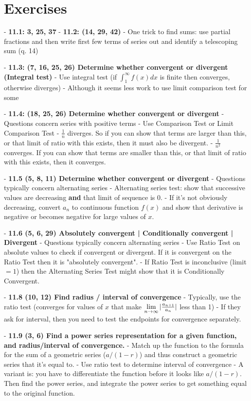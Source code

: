 \section{Exercises}

- \textbf{11.1: 3, 25, 37}
- \textbf{11.2: (14, 29, 42)}
    - One trick to find sums: use partial fractions and then write first few terms of series out and identify a telescoping sum (q. 14)

- \textbf{11.3: (7, 16, 25, 26) Determine whether convergent or divergent (Integral test)}
    - Use integral test (if $\int_1^\infty f(x) dx$ is finite then converges, otherwise diverges)
    - Although it seems less work to use limit comparison test for some

- \textbf{11.4: (18, 25, 26) Determine whether convergent or divergent}
    - Questions concern series with positive terms
    - Use Comparison Test or Limit Comparison Test
    - $\frac{1}{n}$ diverges. So if you can show that terms are larger than this, or that limit of ratio with this exists, then it must also be divergent.
    - $\frac{1}{n^2}$ converges. If you can show that terms are smaller than this, or that limit of ratio with this exists, then it converges.

- \textbf{11.5 (5, 8, 11) Determine whether convergent or divergent}
    - Questions typically concern alternating series
    - Alternating series test: show that successive values are decreasing \textbf{and} that limit of sequence is 0.
    - If it's not obviously decreasing, convert $a_n$ to continuous function $f(x)$ and show that derivative is negative or becomes negative for large values of $x$.

- \textbf{11.6 (5, 6, 29) Absolutely convergent | Conditionally convergent | Divergent}
    - Questions typically concern alternating series
    - Use Ratio Test on absolute values to check if convergent or divergent. If it is convergent on the Ratio Test then it is "absolutely convergent".
    - If Ratio Test is inconclusive (limit $= 1$) then the Alternating Series Test might show that it is Conditionally Convergent.

- \textbf{11.8 (10, 12) Find radius / interval of convergence}
    - Typically, use the ratio test (converges for values of $x$ that make $\lim\limits_{n \to \infty} |\frac{a_{n+1}}{a_n}|$ less than 1)
    - If they ask for interval, then you need to test the endpoints for convergence separately.

- \textbf{11.9 (3, 6) Find a power series representation for a given function, and radius/interval of convergence.}
    - Match up the function to the formula for the sum of a geometric series ($a/(1-r)$) and thus construct a geometric series that it's equal to.
    - Use ratio test to determine interval of convergence
    - A variant is: you have to differentiate the function before it looks like $a/(1-r)$. Then find the power series, and integrate the power series to get something equal to the original function.

